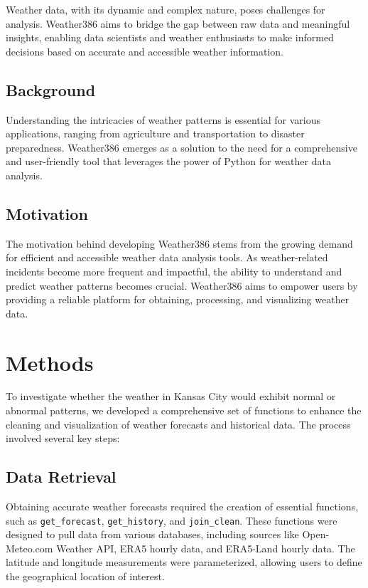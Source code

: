 \documentclass[conference]{IEEEtran}
\begin{document}
    Weather data, with its dynamic and complex nature, poses challenges for analysis. Weather386 aims to bridge the gap between raw data and meaningful insights, enabling data scientists and weather enthusiasts to make informed decisions based on accurate and accessible weather information.

    \subsection{Background}
    Understanding the intricacies of weather patterns is essential for various applications, ranging from agriculture and transportation to disaster preparedness. Weather386 emerges as a solution to the need for a comprehensive and user-friendly tool that leverages the power of Python for weather data analysis.

    \subsection{Motivation}
    The motivation behind developing Weather386 stems from the growing demand for efficient and accessible weather data analysis tools. As weather-related incidents become more frequent and impactful, the ability to understand and predict weather patterns becomes crucial. Weather386 aims to empower users by providing a reliable platform for obtaining, processing, and visualizing weather data.



\section{Methods}
    To investigate whether the weather in Kansas City would exhibit normal or abnormal patterns, we developed a comprehensive set of functions to enhance the cleaning and visualization of weather forecasts and historical data. The process involved several key steps:

\subsection{Data Retrieval}
    Obtaining accurate weather forecasts required the creation of essential functions, such as \texttt{get\_forecast}, \texttt{get\_history}, and \texttt{join\_clean}. These functions were designed to pull data from various databases, including sources like Open-Meteo.com Weather API, ERA5 hourly data, and ERA5-Land hourly data. The latitude and longitude measurements were parameterized, allowing users to define the geographical location of interest.
\end{document}
